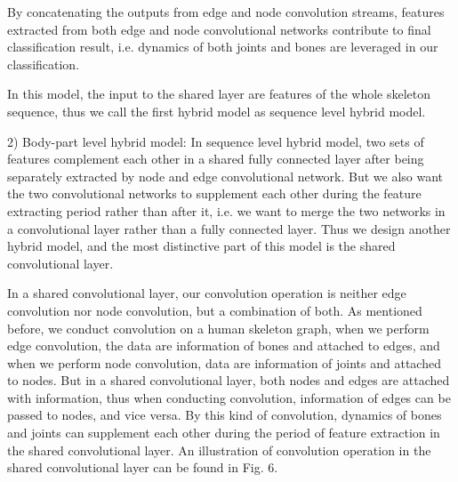 \documentclass[a4paper,11pt]{article}
\begin{document}
By concatenating the outputs from edge and node convolution streams, features extracted from both edge and node convolutional networks contribute to final classification result, i.e. dynamics of both joints and bones are leveraged in our classification.


In this model, the input to the shared layer are features of the whole skeleton sequence, thus we call the first hybrid model as sequence level hybrid model.



2) Body-part level hybrid model: In sequence level hybrid model, two sets of features complement each other in a shared fully connected layer after being separately extracted by node and edge convolutional network. But we also want the two convolutional networks to supplement each other during the feature extracting period rather than after it, i.e. we want to merge the two networks in a convolutional layer rather than a fully connected layer. Thus we design another hybrid model, and the most distinctive part of this model is the shared convolutional layer.

 In a shared convolutional layer, our convolution operation is neither edge convolution nor node convolution, but a combination of both. As mentioned before, we conduct convolution on a human skeleton graph, when we perform edge convolution, the data are information of bones and attached to edges, and when we perform node convolution, data are information of joints and attached to nodes. But in a shared convolutional layer, both nodes and edges are attached with information, thus when conducting convolution, information of edges can be passed to nodes, and vice versa. By this kind of convolution, dynamics of bones and joints can supplement each other during the period of feature extraction in the shared convolutional layer. An illustration of convolution operation in the shared convolutional layer can be found in Fig. 6.
\end{document}

